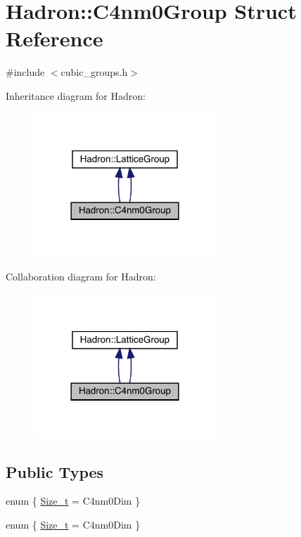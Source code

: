 \hypertarget{structHadron_1_1C4nm0Group}{}\section{Hadron\+:\+:C4nm0\+Group Struct Reference}
\label{structHadron_1_1C4nm0Group}


{\ttfamily \#include $<$cubic\+\_\+groups.\+h$>$}



Inheritance diagram for Hadron\+:\nopagebreak
\begin{figure}[H]
\begin{center}
\leavevmode
\includegraphics[width=194pt]{da/d73/structHadron_1_1C4nm0Group__inherit__graph}
\end{center}
\end{figure}


Collaboration diagram for Hadron\+:\nopagebreak
\begin{figure}[H]
\begin{center}
\leavevmode
\includegraphics[width=194pt]{d0/d36/structHadron_1_1C4nm0Group__coll__graph}
\end{center}
\end{figure}
\subsection*{Public Types}
\begin{DoxyCompactItemize}
\item 
enum \{ \mbox{\hyperlink{structHadron_1_1C4nm0Group_a2b991ffdc66fe1ea6aa1b403832f9521a1f377c16128ebebc5de3fc9673f8ff0d}{Size\+\_\+t}} = C4nm0\+Dim
 \}
\item 
enum \{ \mbox{\hyperlink{structHadron_1_1C4nm0Group_a2b991ffdc66fe1ea6aa1b403832f9521a1f377c16128ebebc5de3fc9673f8ff0d}{Size\+\_\+t}} = C4nm0\+Dim
 \}
\end{DoxyCompactItemize}
